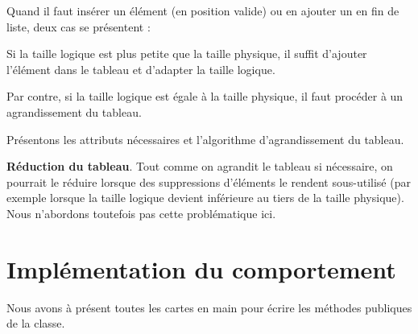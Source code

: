 Quand il faut insérer un élément (en position valide) ou en ajouter un
en fin de liste, deux cas se présentent :

\begin{liste}
	\item 
		Si la taille logique est plus petite que la taille physique, il suffit
		d’ajouter l’élément dans le tableau et d’adapter la taille logique.
	\item 
		Par contre, si la taille logique est égale à la taille physique, il faut
		procéder à un agrandissement du tableau.
\end{liste}

Présentons les attributs nécessaires et l'algorithme
d’agrandissement du tableau.


\bigskip

\textbf{Réduction du tableau}. Tout comme on agrandit le tableau si
nécessaire, on pourrait le réduire lorsque des suppressions d’éléments
le rendent sous-utilisé (par exemple lorsque la taille logique devient
inférieure au tiers de la taille physique). Nous n’abordons toutefois
pas cette problématique ici.


\section{Implémentation du comportement}

Nous avons à présent toutes les cartes en main pour écrire les méthodes
publiques de la classe.


